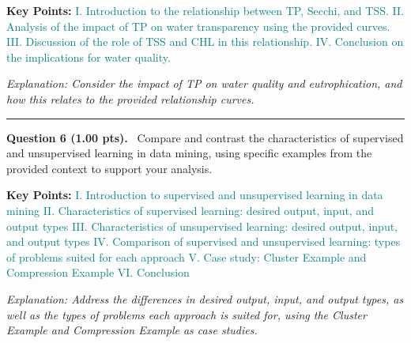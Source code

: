\documentclass[12pt,a4paper]{article}
\begin{document}
\textbf{Key Points:} \textcolor{teal}{I. Introduction to the relationship between TP, Secchi, and TSS. II. Analysis of the impact of TP on water transparency using the provided curves. III. Discussion of the role of TSS and CHL in this relationship. IV. Conclusion on the implications for water quality.}



\textit{\small Explanation: Consider the impact of TP on water quality and eutrophication, and how this relates to the provided relationship curves.}



\vspace{0.8em}
\noindent\rule{\linewidth}{0.2pt}
\vspace{0.3em}


\noindent
\textbf{Question 6 (1.00 pts).}~
Compare and contrast the characteristics of supervised and unsupervised learning in data mining, using specific examples from the provided context to support your analysis.


\textbf{Key Points:} \textcolor{teal}{I. Introduction to supervised and unsupervised learning in data mining
II. Characteristics of supervised learning: desired output, input, and output types
III. Characteristics of unsupervised learning: desired output, input, and output types
IV. Comparison of supervised and unsupervised learning: types of problems suited for each approach
V. Case study: Cluster Example and Compression Example
VI. Conclusion}



\textit{\small Explanation: Address the differences in desired output, input, and output types, as well as the types of problems each approach is suited for, using the Cluster Example and Compression Example as case studies.}
\end{document}
